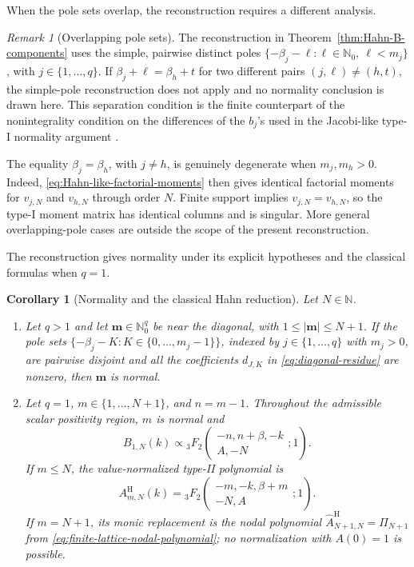\documentclass[10pt]{amsart}
\newcommand{\N}{\mathbb N}
\newcommand{\Nzero}{\mathbb N_0}
\newcommand{\mm}{\boldsymbol m}
\newcommand{\abs}[1]{\lvert#1\rvert}
\newcommand{\pFq}[5]{{}_{#1}F_{#2}\!\left(\begin{matrix}#3\\#4\end{matrix};#5\right)}
\theoremstyle{plain}
\newtheorem{corollary}[theorem]{Corollary}
\theoremstyle{definition}
\theoremstyle{remark}
\newtheorem{remark}[theorem]{Remark}
\begin{document}
When the pole sets overlap, the reconstruction requires a different analysis.

\begin{remark}[Overlapping pole sets]
\label{rem:Hahn-overlapping-poles}
The reconstruction in Theorem~\ref{thm:Hahn-B-components} uses the simple,
pairwise distinct poles
\(\{-\beta_j-\ell:\ell\in\Nzero,\ \ell<m_j\}\), with
\(j\in\{1,\ldots,q\}\).
If \(\beta_j+\ell=\beta_h+t\) for two different pairs
\((j,\ell)\ne(h,t)\), the simple-pole reconstruction does not apply and no
normality conclusion is drawn here. This separation condition is the finite
counterpart of the nonintegrality condition on the differences of the
\(b_j\)'s used in the Jacobi-like type-I normality argument
\cite[Proposition~2.7]{Wolfs2024}.

The equality \(\beta_j=\beta_h\), with \(j\ne h\), is genuinely
degenerate when \(m_j,m_h>0\). Indeed,
\eqref{eq:Hahn-like-factorial-moments} then gives identical factorial
moments for \(v_{j,N}\) and \(v_{h,N}\) through order \(N\). Finite support
implies \(v_{j,N}=v_{h,N}\), so the type-I moment matrix has identical
columns and is singular. More general overlapping-pole cases are outside
the scope of the present reconstruction.
\end{remark}

The reconstruction gives normality under its explicit hypotheses and the classical
formulas when \(q=1\).

\begin{corollary}[Normality and the classical Hahn reduction]
\label{cor:Hahn-normality}
Let \(N\in\N\).
\begin{enumerate}[label=\textup{(\roman*)}]
\item Let \(q>1\) and let \(\mm\in\Nzero^q\) be near the diagonal, with
\(1\le\abs\mm\le N+1\). If the pole sets
\(\{-\beta_j-K:K\in\{0,\ldots,m_j-1\}\}\), indexed by
\(j\in\{1,\ldots,q\}\) with \(m_j>0\), are pairwise disjoint and all the
coefficients \(d_{J,K}\) in \eqref{eq:diagonal-residue} are nonzero, then
\(\mm\) is normal.
\item Let \(q=1\), \(m\in\{1,\ldots,N+1\}\), and \(n=m-1\). Throughout
the admissible scalar positivity region, \(m\) is normal and
\[
 B_{1,N}(k)\propto\pFq{3}{2}{-n,n+\beta,-k}{A,-N}{1}.
\]
If \(m\le N\), the value-normalized type-II polynomial is
  \[
  A^{\mathrm H}_{m,N}(k)=
  \pFq{3}{2}{-m,-k,\beta+m}{-N,A}{1}.
  \]
If \(m=N+1\), its monic replacement is the nodal polynomial
\(\widehat A^{\mathrm H}_{N+1,N}=\Pi_{N+1}\) from
\eqref{eq:finite-lattice-nodal-polynomial}; no normalization with
\(A(0)=1\) is possible.
\end{enumerate}
\end{corollary}
\end{document}
